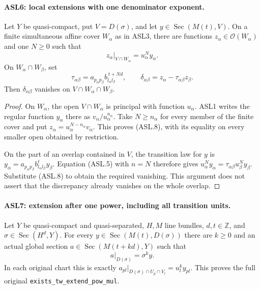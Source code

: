 \documentclass[11pt,a4paper]{article}
\numberwithin{equation}{section}
\theoremstyle{remark}\newtheorem{remark}[theorem]{Remark}
\begin{document}
\paragraph{ASL6: local extensions with one denominator exponent.}
\label{claim:ASL6}
Let $Y$ be quasi-compact, put $V=D(\sigma)$, and let
$y\in\operatorname{Sec}(M(t),V)$.  On a finite simultaneous
affine cover $W_\alpha$ as in ASL3, there are functions
$z_\alpha\in\mathcal O(W_\alpha)$ and one $N\ge0$ such that
\[
 z_\alpha|_{V\cap W_\alpha}
      =u_\alpha^N y_\alpha.                         \tag{ASL.8}
\]
On $W_\alpha\cap W_\beta$, set
\[
 \tau_{\alpha\beta}=a_{p_\alpha p_\beta}
                  b_{l_\alpha l_\beta}^{\,t+Nd},
 \qquad
 \delta_{\alpha\beta}=z_\alpha-\tau_{\alpha\beta}z_\beta.
                                                        \tag{ASL.9}
\]
Then $\delta_{\alpha\beta}$ vanishes on
$V\cap W_\alpha\cap W_\beta$.

\begin{proof}
On $W_\alpha$, the open $V\cap W_\alpha$ is principal with
function $u_\alpha$.  ASL1 writes the regular function
$y_\alpha$ there as $v_\alpha/u_\alpha^{n_\alpha}$.
Take $N\ge n_\alpha$ for every member of the finite cover and
put $z_\alpha=u_\alpha^{N-n_\alpha}v_\alpha$.
This proves (ASL.8), with its equality on every smaller open
obtained by restriction.

On the part of an overlap contained in $V$, the transition law
for $y$ is $y_\alpha=a_{p_\alpha p_\beta}
b_{l_\alpha l_\beta}^{t}y_\beta$.  Equation (ASL.5) with
$n=N$ therefore gives
$u_\alpha^Ny_\alpha=\tau_{\alpha\beta}
u_\beta^Ny_\beta$.  Substitute (ASL.8) to obtain the required
vanishing.  This argument does not assert that the discrepancy
already vanishes on the whole overlap.
\end{proof}

\paragraph{ASL7: extension after one power, including all transition units.}
\label{claim:ASL7}
Let $Y$ be quasi-compact and quasi-separated, $H,M$ line bundles,
$d,t\in\mathbb Z$, and $\sigma\in\operatorname{Sec}(H^d,Y)$.
For every $y\in\operatorname{Sec}(M(t),D(\sigma))$ there are
$k\ge0$ and an actual global section
$a\in\operatorname{Sec}(M(t+kd),Y)$ such that
\[
                  a|_{D(\sigma)}=\sigma^k y.          \tag{ASL.10}
\]
In each original chart this is exactly
$a_{pl}|_{D(\sigma)\cap U_p\cap V_l}=u_l^ky_{pl}$.
This proves the full original \texttt{exists\_\allowbreak{}tw\_\allowbreak{}extend\_\allowbreak{}pow\_\allowbreak{}mul}.
\end{document}
